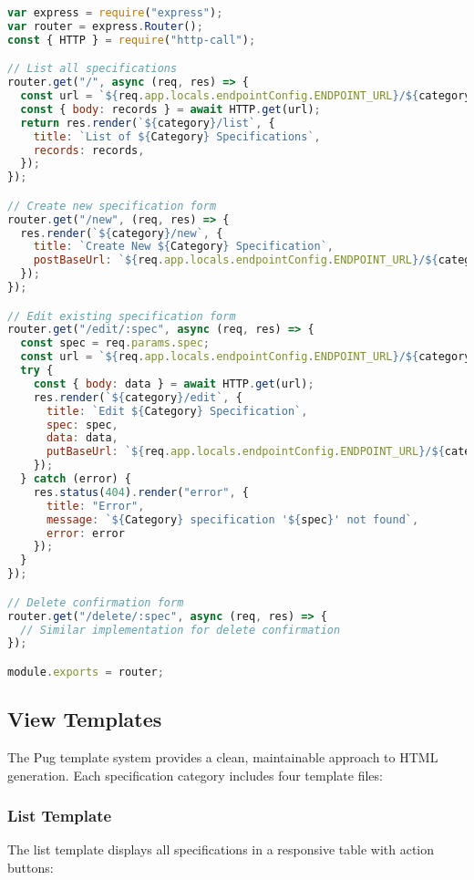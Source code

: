 \documentclass[11pt,a4paper]{article}
\begin{document}
\begin{lstlisting}[language=JavaScript, caption=Generic Router Pattern]
var express = require("express");
var router = express.Router();
const { HTTP } = require("http-call");

// List all specifications
router.get("/", async (req, res) => {
  const url = `${req.app.locals.endpointConfig.ENDPOINT_URL}/${category}`;
  const { body: records } = await HTTP.get(url);
  return res.render(`${category}/list`, {
    title: `List of ${Category} Specifications`,
    records: records,
  });
});

// Create new specification form
router.get("/new", (req, res) => {
  res.render(`${category}/new`, {
    title: `Create New ${Category} Specification`,
    postBaseUrl: `${req.app.locals.endpointConfig.ENDPOINT_URL}/${category}`,
  });
});

// Edit existing specification form
router.get("/edit/:spec", async (req, res) => {
  const spec = req.params.spec;
  const url = `${req.app.locals.endpointConfig.ENDPOINT_URL}/${category}/${spec}`;
  try {
    const { body: data } = await HTTP.get(url);
    res.render(`${category}/edit`, {
      title: `Edit ${Category} Specification`,
      spec: spec,
      data: data,
      putBaseUrl: `${req.app.locals.endpointConfig.ENDPOINT_URL}/${category}`,
    });
  } catch (error) {
    res.status(404).render("error", {
      title: "Error",
      message: `${Category} specification '${spec}' not found`,
      error: error
    });
  }
});

// Delete confirmation form
router.get("/delete/:spec", async (req, res) => {
  // Similar implementation for delete confirmation
});

module.exports = router;
\end{lstlisting}

\subsection{View Templates}

The Pug template system provides a clean, maintainable approach to HTML generation. Each specification category includes four template files:

\subsubsection{List Template}
The list template displays all specifications in a responsive table with action buttons:
\end{document}
